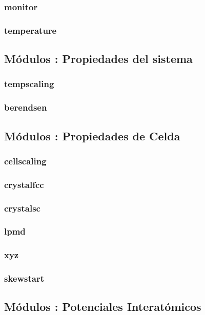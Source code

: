\documentclass[a4paper,10pt]{scrbook}
\begin{document}
\subsubsection{monitor}
\subsubsection{temperature}

\subsection{M\'odulos : Propiedades del sistema}
\subsubsection{tempscaling}
\subsubsection{berendsen}

\subsection{M\'odulos : Propiedades de Celda}
\subsubsection{cellscaling}
\subsubsection{crystalfcc}
\subsubsection{crystalsc}
\subsubsection{lpmd}
\subsubsection{xyz}
\subsubsection{skewstart}

\subsection{M\'odulos : Potenciales Interat\'omicos}
\end{document}
